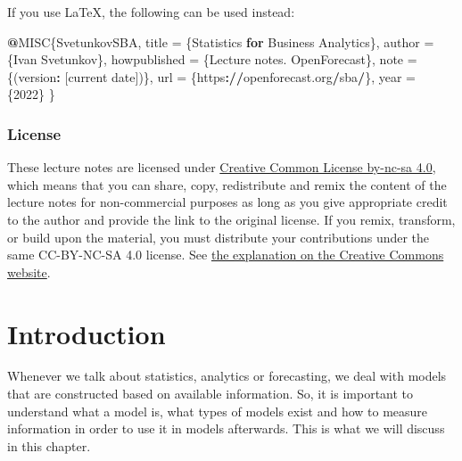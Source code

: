 \documentclass[
]{book}
\newenvironment{Shaded}{\begin{snugshade}}{\end{snugshade}}
\newcommand{\ControlFlowTok}[1]{\textcolor[rgb]{0.13,0.29,0.53}{\textbf{#1}}}
\newcommand{\DecValTok}[1]{\textcolor[rgb]{0.00,0.00,0.81}{#1}}
\newcommand{\ErrorTok}[1]{\textcolor[rgb]{0.64,0.00,0.00}{\textbf{#1}}}
\newcommand{\NormalTok}[1]{#1}
\newcommand{\OperatorTok}[1]{\textcolor[rgb]{0.81,0.36,0.00}{\textbf{#1}}}
\newcommand{\StringTok}[1]{\textcolor[rgb]{0.31,0.60,0.02}{#1}}
\theoremstyle{definition}
\theoremstyle{definition}
\theoremstyle{definition}
\theoremstyle{definition}
\theoremstyle{remark}
\begin{document}
If you use LaTeX, the following can be used instead:

\begin{Shaded}
\begin{Highlighting}[]
\OperatorTok{@}\NormalTok{MISC\{SvetunkovSBA,}
\NormalTok{    title =}\StringTok{ }\NormalTok{\{Statistics }\ControlFlowTok{for}\NormalTok{ Business Analytics\},}
\NormalTok{    author =}\StringTok{ }\NormalTok{\{Ivan Svetunkov\},}
\NormalTok{    howpublished =}\StringTok{ }\NormalTok{\{Lecture notes. OpenForecast\},}
\NormalTok{    note =}\StringTok{ }\NormalTok{\{(version}\OperatorTok{:}\StringTok{ }\NormalTok{[current date])\},}
\NormalTok{    url =}\StringTok{ }\NormalTok{\{https}\OperatorTok{:}\ErrorTok{//}\NormalTok{openforecast.org}\OperatorTok{/}\NormalTok{sba}\OperatorTok{/}\NormalTok{\},}
\NormalTok{    year =}\StringTok{ }\NormalTok{\{}\DecValTok{2022}\NormalTok{\}}
\NormalTok{\}}
\end{Highlighting}
\end{Shaded}

\hypertarget{license}{%
\subsection*{License}\label{license}}

These lecture notes are licensed under \href{https://creativecommons.org/licenses/by-nc-sa/4.0/}{Creative Common License by-nc-sa 4.0}, which means that you can share, copy, redistribute and remix the content of the lecture notes for non-commercial purposes as long as you give appropriate credit to the author and provide the link to the original license. If you remix, transform, or build upon the material, you must distribute your contributions under the same CC-BY-NC-SA 4.0 license. See \href{https://creativecommons.org/licenses/by-nc-sa/4.0/}{the explanation on the Creative Commons website}.

\hypertarget{intro}{%
\chapter{Introduction}\label{intro}}

Whenever we talk about statistics, analytics or forecasting, we deal with models that are constructed based on available information. So, it is important to understand what a model is, what types of models exist and how to measure information in order to use it in models afterwards. This is what we will discuss in this chapter.
\end{document}
